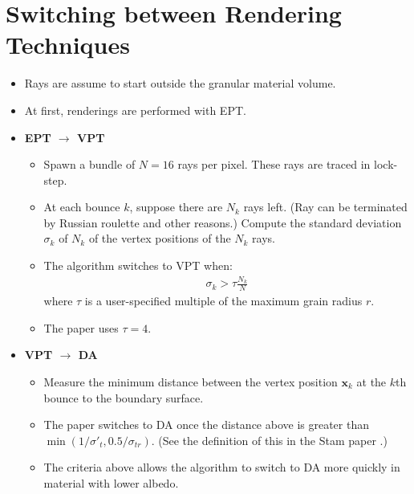 \documentclass[10pt]{article}
\newcommand{\ve}[1]{\mathbf{#1}}
\newcommand{\ra}{\rightarrow}
\begin{document}
  \section{Switching between Rendering Techniques}

  \begin{itemize}
    \item Rays are assume to start outside the granular material volume.

    \item At first, renderings are performed with EPT.

    \item {\bf EPT $\ra$ VPT}
    \begin{itemize}
      \item Spawn a bundle of $N = 16$ rays per pixel.  These rays are traced in lock-step.

      \item At each bounce $k$, suppose there are $N_k$ rays left.  (Ray can be terminated by Russian roulette and other reasons.)  Compute the standard deviation $\sigma_k$ of $N_k$ of the vertex positions of the $N_k$ rays.

      \item The algorithm switches to VPT when:
      \begin{align*}
        \sigma_k > \tau \frac{N_k}{N}
      \end{align*}
      where $\tau$ is a user-specified multiple of the maximum grain radius $r$.

      \item The paper uses $\tau = 4$.
    \end{itemize}

    \item {\bf VPT $\ra$ DA}
    \begin{itemize}
      \item Measure the minimum distance between the vertex position $\ve{x}_k$ at the $k$th bounce to the boundary surface.

      \item The paper switches to DA once the distance above is greater than $\min(1/\sigma'_t, 0.5/\sigma_{tr} )$.  (See the definition of this in the Stam paper \cite{Stam:1995}.)

      \item The criteria above allows the algorithm to switch to DA more quickly in material with lower albedo.      
    \end{itemize}


\end{itemize}
\end{document}
